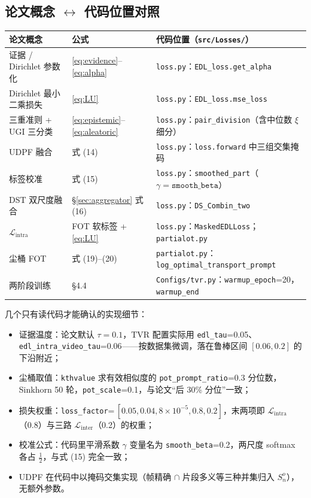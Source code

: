 \documentclass[11pt,a4paper,UTF8,fontset=windows]{ctexart}
\newcommand{\code}[1]{\texttt{#1}}
\begin{document}
\subsection{论文概念 $\leftrightarrow$ 代码位置对照}

\begin{table}[h]
\centering
\small
\begin{tabular}{@{}lll@{}}
\toprule
论文概念 & 公式 & 代码位置（\code{src/Losses/}） \\
\midrule
证据 / Dirichlet 参数化 & \eqref{eq:evidence}--\eqref{eq:alpha} & \code{loss.py}：\code{EDL\_loss.get\_alpha} \\
Dirichlet 最小二乘损失 & \eqref{eq:LU} & \code{loss.py}：\code{EDL\_loss.mse\_loss} \\
三重准则 + UGI 三分类 & \eqref{eq:epistemic}--\eqref{eq:aleatoric} & \code{loss.py}：\code{pair\_division}（含中位数 $\xi$ 细分） \\
UDPF 融合 & 式 (14) & \code{loss.py}：\code{loss.forward} 中三组交集掩码 \\
标签校准 & 式 (15) & \code{loss.py}：\code{smoothed\_part}（$\gamma=\code{smooth\_beta}$） \\
DST 双尺度融合 & \S\ref{sec:aggregator} 式 (16) & \code{loss.py}：\code{DS\_Combin\_two} \\
$\mathcal{L}_{\mathrm{intra}}$ & FOT 软标签 + \eqref{eq:LU} & \code{loss.py}：\code{MaskedEDLLoss}；\code{partialot.py} \\
尘桶 FOT & 式 (19)--(20) & \code{partialot.py}：\code{log\_optimal\_transport\_prompt} \\
两阶段训练 & \S 4.4 & \code{Configs/tvr.py}：\code{warmup\_epoch}=20，\code{warmup\_end} \\
\bottomrule
\end{tabular}
\end{table}

几个只有读代码才能确认的实现细节：
\begin{itemize}[itemsep=1pt,topsep=2pt]
  \item 证据温度：论文默认 $\tau=0.1$，TVR 配置实际用 \code{edl\_tau}=0.05、\code{edl\_intra\_video\_tau}=0.06——按数据集微调，落在鲁棒区间 $[0.06,0.2]$ 的下沿附近；
  \item 尘桶取值：\code{kthvalue} 求有效相似度的 \code{pot\_prompt\_ratio}=0.3 分位数，Sinkhorn 50 轮，\code{pot\_scale}=0.1，与论文“后 30\% 分位”一致；
  \item 损失权重：\code{loss\_factor}=\,$[0.05,0.04,8\times10^{-5},0.8,0.2]$，末两项即 $\mathcal{L}_{\mathrm{intra}}$（0.8）与三路 $\mathcal{L}_{\mathrm{inter}}$（0.2）的权重；
  \item 校准公式：代码里平滑系数 $\gamma$ 变量名为 \code{smooth\_beta}=0.2，两尺度 softmax 各占 $\tfrac{1}{2}$，与式 (15) 完全一致；
  \item UDPF 在代码中以掩码交集实现（帧精确 $\cap$ 片段多义等三种并集归入 $S^o_n$），无额外参数。
\end{itemize}
\end{document}

